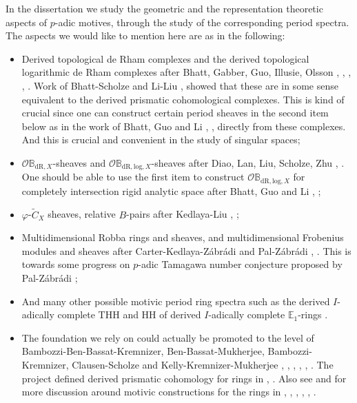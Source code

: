 \documentclass[11pt]{report}
\begin{document}
In the dissertation \cite{T7} we study the geometric and the representation theoretic aspects of $p$-adic motives, through the study of the corresponding period spectra. The aspects we would like to mention here are as in the following:\\
\begin{itemize}
\justifying
\item<1-> Derived topological de Rham complexes and the derived topological logarithmic de Rham complexes after Bhatt, Gabber, Guo, Illusie, Olsson \cite{B1}, \cite{O1}, \cite{G}, \cite{Ill1}, \cite{Ill2}. Work of Bhatt-Scholze and Li-Liu \cite{BS}, \cite{LL} showed that these are in some sense equivalent to the derived prismatic cohomological complexes. This is kind of crucial since one can construct certain period sheaves in the second item below as in the work of Bhatt, Guo and Li \cite{B1}, \cite{GL}, directly from these complexes. And this is crucial and convenient in the study of singular spaces; \\  

\item<2-> $\mathcal{O}\mathbb{B}_{\mathrm{dR},X}$-sheaves and $\mathcal{O}\mathbb{B}_{\mathrm{dR},\mathrm{log},X}$-sheaves after Diao, Lan, Liu, Scholze, Zhu \cite{DLLZ}, \cite{Scho1}. One should be able to use the first item to construct $\mathcal{O}\mathbb{B}_{\mathrm{dR},\mathrm{log},X}$ for completely intersection rigid analytic space after Bhatt, Guo and Li \cite{B1}, \cite{GL};\\ 


\item<3-> $\varphi$-$\widetilde{C}_{X}$ sheaves, relative $B$-pairs after Kedlaya-Liu \cite{KL1}, \cite{KL2};\\


\item<4-> Multidimensional Robba rings and sheaves, and multidimensional Frobenius modules and sheaves after Carter-Kedlaya-Z\'abr\'adi and Pal-Z\'abr\'adi \cite{CKZ}, \cite{PZ}. This is towards some progress on $p$-adic Tamagawa number conjecture proposed by Pal-Z\'abr\'adi \cite{PZ};\\

\item<5-> And many other possible motivic period ring spectra such as the derived $I$-adically complete THH and HH of derived $I$-adically complete $\mathbb{E}_1$-rings \cite{NS}.\\

\item<6-> The foundation we rely on could actually be promoted to the level of Bambozzi-Ben-Bassat-Kremnizer, Ben-Bassat-Mukherjee, Bambozzi-Kremnizer, Clausen-Scholze and Kelly-Kremnizer-Mukherjee \cite{BBBK}, \cite{BBM}, \cite{BK}, \cite{CS2}, \cite{CS1}, \cite{KKM}. The project \cite{M} defined derived prismatic cohomology for rings in \cite{CS2}, \cite{CS1}. Also see \cite{T8} and \cite[Chapter 12]{T7} for more discussion around motivic constructions for the rings in \cite{BBBK}, \cite{BBM}, \cite{BK}, \cite{CS2}, \cite{CS1}, \cite{KKM}.\\
\end{itemize}
\end{document}
